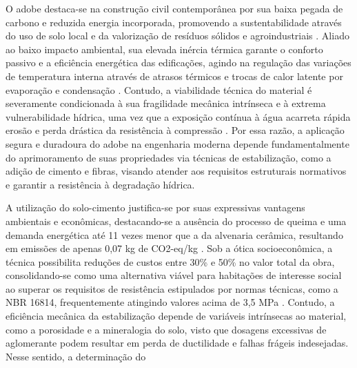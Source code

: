 O adobe destaca-se na construção civil contemporânea por sua baixa pegada de carbono e reduzida energia incorporada, promovendo a sustentabilidade através do uso de solo local e da valorização de resíduos sólidos e agroindustriais \cite{Arduin2022, Khunaprapakorn2025, Arduin2024, Aspillaga2024}. Aliado ao baixo impacto ambiental, sua elevada inércia térmica garante o conforto passivo e a eficiência energética das edificações, agindo na regulação das variações de temperatura interna através de atrasos térmicos e trocas de calor latente por evaporação e condensação \cite{Christoforou2016, Heracleous2023, Rincon2019, Khunaprapakorn2025, Giada2019}. Contudo, a viabilidade técnica do material é severamente condicionada à sua fragilidade mecânica intrínseca e à extrema vulnerabilidade hídrica, uma vez que a exposição contínua à água acarreta rápida erosão e perda drástica da resistência à compressão \cite{Brito2023, Dormohamadi2020, Fages2022,Dao2018,Day1993, Dormohamadi2024}. Por essa razão, a aplicação segura e duradoura do adobe na engenharia moderna depende fundamentalmente do aprimoramento de suas propriedades via técnicas de estabilização, como a adição de cimento e fibras, visando atender aos requisitos estruturais normativos e garantir a resistência à degradação hídrica.


A utilização do solo-cimento justifica-se por suas expressivas vantagens ambientais e econômicas, destacando-se a ausência do processo de queima e uma demanda energética até 11 vezes menor que a da alvenaria cerâmica, resultando em emissões de apenas 0,07 kg de CO2-eq/kg \cite{Barroso2019, Brito2023, Ibrahim2020}. Sob a ótica socioeconômica, a técnica possibilita reduções de custos entre 30\% e 50\% no valor total da obra, consolidando-se como uma alternativa viável para habitações de interesse social ao superar os requisitos de resistência estipulados por normas técnicas, como a NBR 16814, frequentemente atingindo valores acima de 3,5 MPa \cite{Ibrahim2020, Kariyawasam2016, Junior2020, Dao2018, Bogas2019}. Contudo, a eficiência mecânica da estabilização depende de variáveis intrínsecas ao material, como a porosidade e a mineralogia do solo, visto que dosagens excessivas de aglomerante podem resultar em perda de ductilidade e falhas frágeis indesejadas. Nesse sentido, a determinação do %

